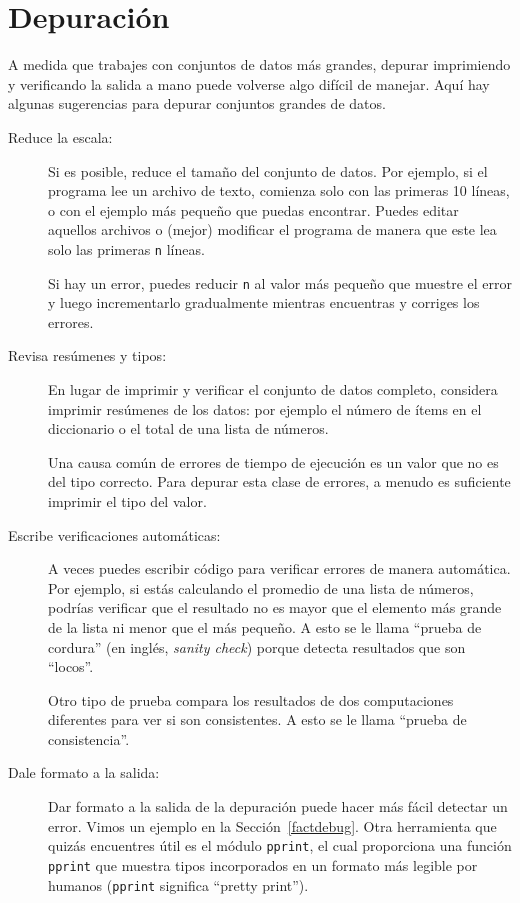 \documentclass[10pt]{book}
\begin{document}
\section{Depuración}

A medida que trabajes con conjuntos de datos más grandes, depurar imprimiendo y
verificando la salida a mano puede volverse algo difícil de manejar.  Aquí hay algunas
sugerencias para depurar conjuntos grandes de datos.

\begin{description}

\item[Reduce la escala:] Si es posible, reduce el tamaño del
conjunto de datos.  Por ejemplo, si el programa lee un archivo de texto, comienza 
solo con las primeras 10 líneas, o con el ejemplo más pequeño que puedas encontrar.
Puedes editar aquellos archivos o (mejor) modificar el
programa de manera que este lea solo las primeras {\tt n} líneas.

Si hay un error, puedes reducir {\tt n} al valor más pequeño
que muestre el error y luego incrementarlo gradualmente
mientras encuentras y corriges los errores.

\item[Revisa resúmenes y tipos:] En lugar de imprimir y verificar el conjunto
de datos completo, considera imprimir resúmenes de los datos: por ejemplo
el número de ítems en el diccionario o el total de una lista de números.

Una causa común de errores de tiempo de ejecución es un valor que no es del tipo
correcto.  Para depurar esta clase de errores, a menudo es suficiente imprimir
el tipo del valor.

\item[Escribe verificaciones automáticas:]  A veces puedes escribir código para verificar
errores de manera automática. Por ejemplo, si estás calculando el
promedio de una lista de números, podrías verificar que el resultado no
es mayor que el elemento más grande de la lista ni menor que
el más pequeño. A esto se le llama ``prueba de cordura'' (en inglés, {\em sanity check})
porque detecta resultados que son ``locos''.

Otro tipo de prueba compara los resultados de dos computaciones
diferentes para ver si son consistentes. A esto se le llama
``prueba de consistencia''.

\item[Dale formato a la salida:] Dar formato a la salida de la depuración
puede hacer más fácil detectar un error.  Vimos un ejemplo en la 
Sección~\ref{factdebug}.  Otra herramienta que quizás encuentres útil es el módulo {\tt pprint},
el cual proporciona una función {\tt pprint} que muestra tipos incorporados en
un formato más legible por humanos ({\tt pprint} significa
``pretty print'').

\end{description}
\end{document}
